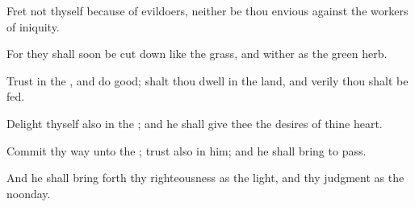 {\Q {}Fret not thyself because of
evildoers, neither be thou
envious against the
workers of
iniquity.


\par }{\Q {}For they shall
soon be cut
down like the
grass, and
wither as the
green
herb.


\par }{\Q {}Trust in the
{}, and
do
good;
{} shalt thou
dwell in the
land, and
verily thou shalt be
fed.


\par }{\Q {}Delight thyself also in the
{}; and he shall
give thee the
desires of thine
heart.


\par }{\Q {}Commit thy
way unto the
{};
trust also in him; and he shall bring
{} to
pass.


\par }{\Q {}And he shall bring
forth thy
righteousness as the
light, and thy
judgment as the
noonday.


\par }{\BB \par }

